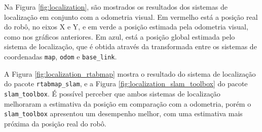 \documentclass[repeatfields,xlists,xpacks,oneside,yearsonly]{ufrgscca}
\begin{document}
Na Figura \ref{fig:localization}, são mostrados os resultados dos sistemas
de localização em conjunto com a odometria visual. Em vermelho está a posição
real do robô, no eixos X e Y, e em verde a posição estimada pela odometria visual,
como nos gráficos anteriores. Em azul, está a posição global estimada pelo sistema
de localização, que é obtida através da transformada entre os sistemas de coordenadas
\texttt{map}, \texttt{odom} e \texttt{base\_link}.

A Figura \ref{fig:localization_rtabmap} mostra o resultado do sistema de localização
do pacote \texttt{rtabmap\_slam}, e a Figura \ref{fig:localization_slam_toolbox} do
pacote \texttt{slam\_toolbox}.
É possível perceber que ambos sistemas de localização melhoraram a estimativa da posição
em comparação com a odometria, porém o \texttt{slam\_toolbox} apresentou um desempenho
melhor, com uma estimativa mais próxima da posição real do robô.
\end{document}
